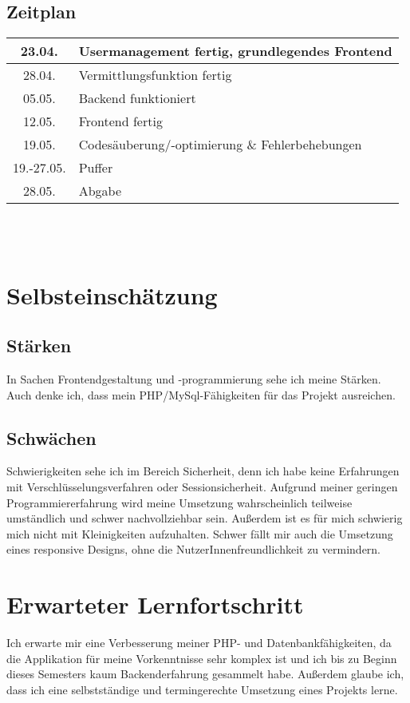 \documentclass{article} %
\begin{document}
\subsection{Zeitplan}
\begin{tabular}{|c|l|}
\hline 
23.04. & Usermanagement fertig, grundlegendes Frontend \\ 
\hline 
28.04. & Vermittlungsfunktion  fertig \\ 
\hline 
05.05. & Backend funktioniert \\ 
\hline 
12.05. & Frontend fertig \\ 
\hline 
19.05. & Codesäuberung/-optimierung \& Fehlerbehebungen \\ 
\hline 
19.-27.05. & Puffer \\ 
\hline 
28.05. & Abgabe \\ 
\hline 
\end{tabular} 
\\
\\

\section{Selbsteinschätzung}
\subsection{Stärken}
In Sachen Frontendgestaltung und -programmierung sehe ich meine Stärken. Auch denke ich, dass mein PHP/MySql-Fähigkeiten für das Projekt ausreichen.

\subsection{Schwächen}

Schwierigkeiten sehe ich im Bereich Sicherheit, denn ich habe keine Erfahrungen mit Verschlüsselungsverfahren oder Sessionsicherheit. Aufgrund meiner geringen Programmiererfahrung wird meine Umsetzung wahrscheinlich teilweise umständlich und schwer nachvollziehbar sein. Außerdem ist es für mich schwierig mich nicht mit Kleinigkeiten aufzuhalten. Schwer fällt mir auch die Umsetzung eines responsive Designs, ohne die NutzerInnenfreundlichkeit zu vermindern.

\section{Erwarteter Lernfortschritt}
Ich erwarte mir eine Verbesserung meiner PHP- und Datenbankfähigkeiten, da die Applikation für meine Vorkenntnisse sehr komplex ist und ich bis zu Beginn dieses Semesters kaum Backenderfahrung gesammelt habe. 
Außerdem glaube ich, dass ich eine selbstständige und termingerechte Umsetzung eines Projekts lerne.
\end{document}
